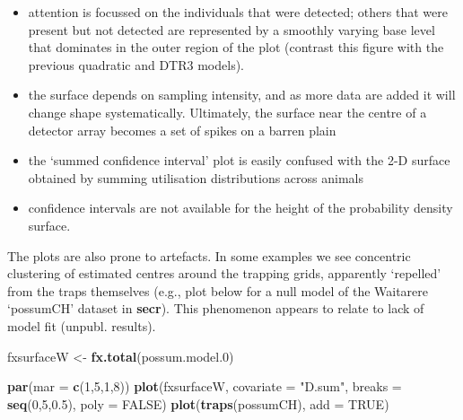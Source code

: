 \documentclass[
]{book}
\newenvironment{Shaded}{\begin{snugshade}}{\end{snugshade}}
\newcommand{\AttributeTok}[1]{\textcolor[rgb]{0.13,0.29,0.53}{#1}}
\newcommand{\ConstantTok}[1]{\textcolor[rgb]{0.56,0.35,0.01}{#1}}
\newcommand{\DecValTok}[1]{\textcolor[rgb]{0.00,0.00,0.81}{#1}}
\newcommand{\FloatTok}[1]{\textcolor[rgb]{0.00,0.00,0.81}{#1}}
\newcommand{\FunctionTok}[1]{\textcolor[rgb]{0.13,0.29,0.53}{\textbf{#1}}}
\newcommand{\NormalTok}[1]{#1}
\newcommand{\OtherTok}[1]{\textcolor[rgb]{0.56,0.35,0.01}{#1}}
\newcommand{\StringTok}[1]{\textcolor[rgb]{0.31,0.60,0.02}{#1}}
\begin{document}
\begin{itemize}
\item
  attention is focussed on the individuals that were detected; others that were present but not detected are represented by a smoothly varying base level that dominates in the outer region of the plot (contrast this figure with the previous quadratic and DTR3 models).
\item
  the surface depends on sampling intensity, and as more data are added it will change shape systematically. Ultimately, the surface near the centre of a detector array becomes a set of spikes on a barren plain
\item
  the `summed confidence interval' plot is easily confused with the 2-D surface obtained by summing utilisation distributions across animals
\item
  confidence intervals are not available for the height of the probability density surface.
\end{itemize}

The plots are also prone to artefacts. In some examples we see concentric clustering of estimated centres around the trapping grids, apparently `repelled' from the traps themselves (e.g., plot below for a null model of the Waitarere `possumCH' dataset in \textbf{secr}). This phenomenon appears to relate to lack of model fit (unpubl. results).

\begin{Shaded}
\begin{Highlighting}[]
\NormalTok{fxsurfaceW }\OtherTok{\textless{}{-}} \FunctionTok{fx.total}\NormalTok{(possum.model}\FloatTok{.0}\NormalTok{)}
\end{Highlighting}
\end{Shaded}

\begin{Shaded}
\begin{Highlighting}[]
\FunctionTok{par}\NormalTok{(}\AttributeTok{mar =} \FunctionTok{c}\NormalTok{(}\DecValTok{1}\NormalTok{,}\DecValTok{5}\NormalTok{,}\DecValTok{1}\NormalTok{,}\DecValTok{8}\NormalTok{))}
\FunctionTok{plot}\NormalTok{(fxsurfaceW, }\AttributeTok{covariate =} \StringTok{"D.sum"}\NormalTok{, }\AttributeTok{breaks =} \FunctionTok{seq}\NormalTok{(}\DecValTok{0}\NormalTok{,}\DecValTok{5}\NormalTok{,}\FloatTok{0.5}\NormalTok{), }
     \AttributeTok{poly =} \ConstantTok{FALSE}\NormalTok{)}
\FunctionTok{plot}\NormalTok{(}\FunctionTok{traps}\NormalTok{(possumCH), }\AttributeTok{add =} \ConstantTok{TRUE}\NormalTok{)}
\end{Highlighting}
\end{Shaded}
\end{document}
